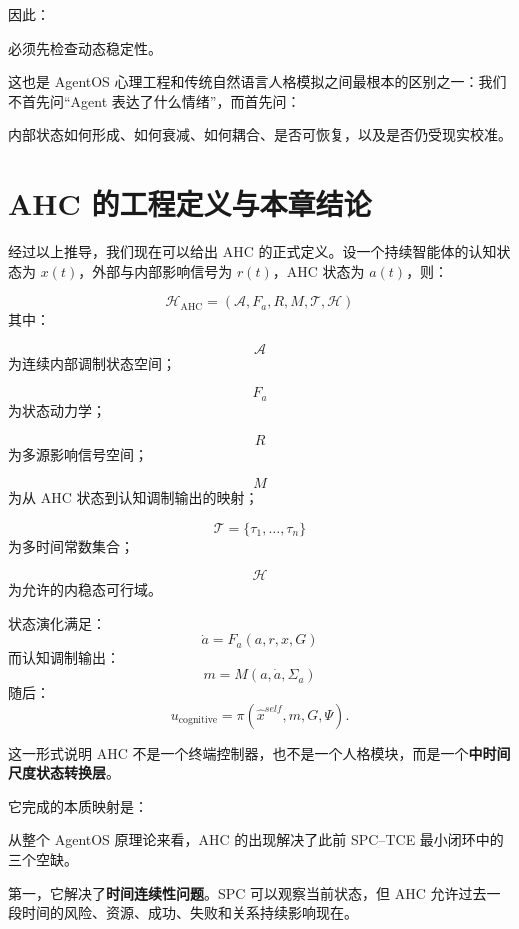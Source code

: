 因此：
\begin{statementbox}
\centering
{}
\end{statementbox}
必须先检查动态稳定性。

这也是 AgentOS 心理工程和传统自然语言人格模拟之间最根本的区别之一：我们不首先问“Agent 表达了什么情绪”，而首先问：
\begin{statementbox}
内部状态如何形成、如何衰减、如何耦合、是否可恢复，以及是否仍受现实校准。
\end{statementbox}

\section{AHC 的工程定义与本章结论}

经过以上推导，我们现在可以给出 AHC 的正式定义。设一个持续智能体的认知状态为 \(x(t)\)，外部与内部影响信号为 \(r(t)\)，AHC 状态为 \(a(t)\)，则：

\[
\boxed{
\mathcal H_{\mathrm{AHC}}
=
(
\mathcal A,
F_a,
R,
M,
\mathcal T,
\mathcal H
)
}
\]
其中：

\[
\mathcal A
\]
为连续内部调制状态空间；

\[
F_a
\]
为状态动力学；

\[
R
\]
为多源影响信号空间；

\[
M
\]
为从 AHC 状态到认知调制输出的映射；

\[
\mathcal T
=
\{\tau_1,\ldots,\tau_n\}
\]
为多时间常数集合；

\[
\mathcal H
\]
为允许的内稳态可行域。

状态演化满足：
\[
\boxed{
\dot a
=
F_a
(
a,
r,
x,
G
)
}
\]
而认知调制输出：
\[
\boxed{
m
=
M(a,\dot a,\Sigma_a)
}
\]
随后：
\[
u_{\mathrm{cognitive}}
=
\pi
(
\hat x^{self},
m,
G,
\Psi
).
\]

这一形式说明 AHC 不是一个终端控制器，也不是一个人格模块，而是一个\textbf{中时间尺度状态转换层}。

它完成的本质映射是：
\begin{statementbox}
\centering
{}
\end{statementbox}

从整个 AgentOS 原理论来看，AHC 的出现解决了此前 SPC--TCE 最小闭环中的三个空缺。

第一，它解决了\textbf{时间连续性问题}。SPC 可以观察当前状态，但 AHC 允许过去一段时间的风险、资源、成功、失败和关系持续影响现在。

